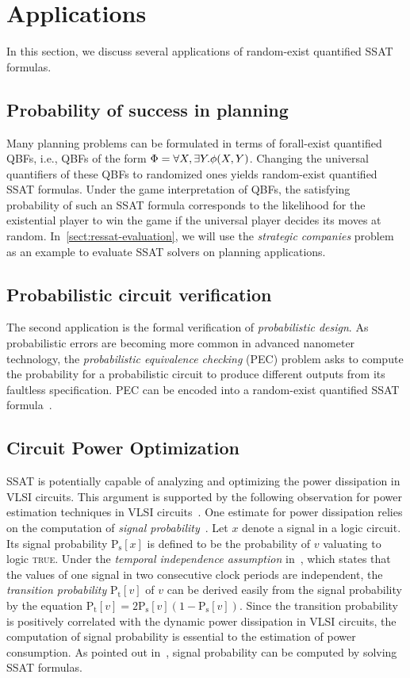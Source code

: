 \section{Applications}
In this section, we discuss several applications of random-exist quantified SSAT formulas.

\subsection{Probability of success in planning}
Many planning problems can be formulated in terms of forall-exist quantified QBFs,
i.e., QBFs of the form $\Phi=\forall X,\exists Y.\phi(X,Y)$.
Changing the universal quantifiers of these QBFs to randomized ones yields random-exist quantified SSAT formulas.
Under the game interpretation of QBFs,
the satisfying probability of such an SSAT formula corresponds to the likelihood
for the existential player to win the game if the universal player decides its moves at random.
In~\cref{sect:ressat-evaluation},
we will use the \textit{strategic companies} problem~\cite{Cadoli1997} as an example
to evaluate SSAT solvers on planning applications.

\subsection{Probabilistic circuit verification}
The second application is the formal verification of \textit{probabilistic design}.
As probabilistic errors are becoming more common in advanced nanometer technology,
the \textit{probabilistic equivalence checking} (PEC) problem asks to compute the probability for a probabilistic circuit to produce different outputs from its faultless specification.
PEC can be encoded into a random-exist quantified SSAT formula~\cite{LeeTC18ProbDesign}.

\iffalse
    \subsection{Circuit Power Optimization}
    SSAT is potentially capable of analyzing and optimizing the power dissipation in VLSI circuits. This argument is supported by the following observation for power estimation techniques in VLSI circuits~\cite{Najm94}. One estimate for power dissipation relies on the computation of \textit{signal probability}~\cite{cirit1987estimating}. Let $x$ denote a signal in a logic circuit. Its signal probability $\mathrm{P_s}[x]$ is defined to be the probability of $v$ valuating to logic \textsc{true}. Under the \textit{temporal independence assumption} in~\cite{Najm94}, which states that the values of one signal in two consecutive clock periods are independent, the \textit{transition probability} $\mathrm{P_t}[v]$ of $v$ can be derived easily from the signal probability by the equation $\mathrm{P_t}[v]=2\mathrm{P_s}[v](1-\mathrm{P_s}[v])$. Since the transition probability is positively correlated with the dynamic power dissipation in VLSI circuits, the computation of signal probability is essential to the estimation of power consumption. As pointed out in~\cite{Lee14}, signal probability can be computed by solving SSAT formulas.

